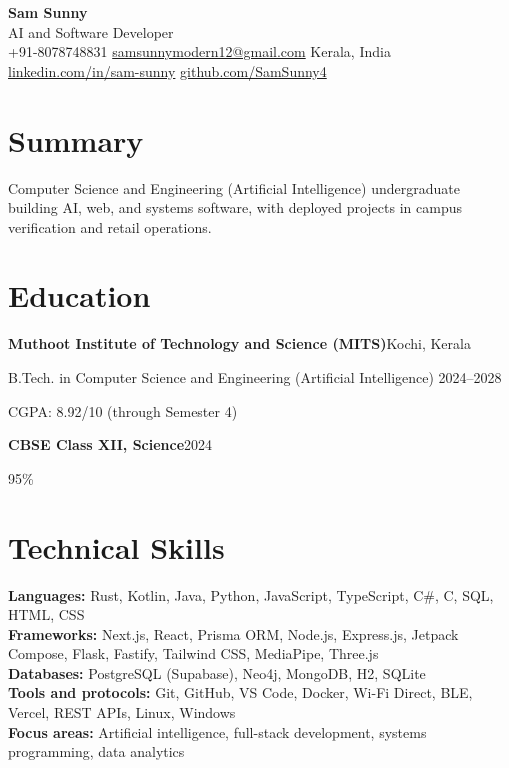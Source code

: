 \documentclass[a4paper,10pt]{article}
\newcommand{\entry}[2]{%
  \noindent\textbf{#1}\hfill{\small #2}\par
}
\begin{document}
\begin{center}
  {\LARGE\textbf{Sam Sunny}}\\[3pt]
  {\small AI and Software Developer}\\[4pt]
  {\small
    +91-8078748831 \textbar{}
    \href{mailto:samsunnymodern12@gmail.com}{samsunnymodern12@gmail.com} \textbar{}
    Kerala, India\\[2pt]
    \href{https://www.linkedin.com/in/sam-sunny-36b4772bb/}{linkedin.com/in/sam-sunny} \textbar{}
    \href{https://github.com/SamSunny4}{github.com/SamSunny4}
  }
\end{center}
\vspace{-7pt}

\section{Summary}
Computer Science and Engineering (Artificial Intelligence) undergraduate building AI, web, and systems software, with deployed projects in campus verification and retail operations.

\section{Education}
\entry{Muthoot Institute of Technology and Science (MITS)}{Kochi, Kerala}
{B.Tech. in Computer Science and Engineering (Artificial Intelligence) \hfill 2024--2028}\par
{CGPA: 8.92/10 (through Semester 4)}\par
\entry{CBSE Class XII, Science}{2024}
{95\%}\par

\section{Technical Skills}
\small
\textbf{Languages:} Rust, Kotlin, Java, Python, JavaScript, TypeScript, C\#, C, SQL, HTML, CSS\\
\textbf{Frameworks:} Next.js, React, Prisma ORM, Node.js, Express.js, Jetpack Compose, Flask, Fastify, Tailwind CSS, MediaPipe, Three.js\\
\textbf{Databases:} PostgreSQL (Supabase), Neo4j, MongoDB, H2, SQLite\\
\textbf{Tools and protocols:} Git, GitHub, VS Code, Docker, Wi-Fi Direct, BLE, Vercel, REST APIs, Linux, Windows\\
\textbf{Focus areas:} Artificial intelligence, full-stack development, systems programming, data analytics
\normalsize
\end{document}
